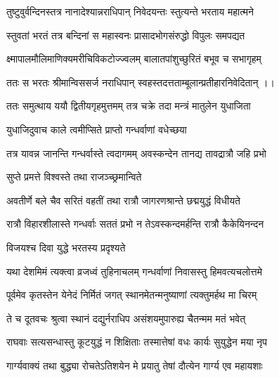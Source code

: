 \twolineshloka
{तुष्टुवुर्वन्दिनस्तत्र नानादेश्यान्नराधिपान्}
{निवेदयन्तः स्तुत्यन्ते भरताय महात्मने}%

\twolineshloka
{स्तुवतां भरतं तत्र बन्दिनां स महास्वनः}
{प्रासादभोगसंरुद्धो विपुलः समपद्यत}%

\twolineshloka
{क्ष्मापालमौलिमाणिक्यमरीचिविकटोज्ज्वलम्}
{बालातपांशुच्छुरितं बभूव च सभागृहम्}%

\twolineshloka
{ततः स भरतः श्रीमान्विससर्ज नराधिपान्}
{स्वहस्तदत्तताम्बूलान्प्रतीहारनिवेदितान् ।।}%

\twolineshloka
{ततः समुत्थाय ययौ द्वितीयगृहमुत्तमम्}
{तत्र चक्रे तदा मन्त्रं मातुलेन युधाजिता}%


{युधाजिदुवाच}
\onelineshloka
{काले त्वमीप्सिते प्राप्तो गन्धर्वाणां वधेच्छया}%

\twolineshloka
{तत्र यावन्न जानन्ति गन्धर्वास्ते त्वदागमम्}
{अवस्कन्देन तानद्य तावद्रात्रौ जहि प्रभो}%



\onelineshloka
{सुप्ते प्रमत्ते विश्वस्ते तथा राजञ्च्छ्रमान्विते}%

\twolineshloka
{अवतीर्णे बले चैव सरितं वहतीं तथा}
{रात्रौ जागरणश्रान्ते छद्मयुद्धं विधीयते}%

\twolineshloka
{रात्रौ विहारशीलास्ते गन्धर्वाः सततं प्रभो}
{न तेऽवस्कन्दमर्हन्ति रात्रौ कैकेयिनन्दन}%

\onelineshloka
{विजयश्च दिवा युद्धे भरतस्य प्रदृश्यते}



\twolineshloka
{यथा देशमिमं त्यक्त्वा व्रजध्वं तुहिनाचलम्}
{गन्धर्वाणां निवासस्तु हिमवत्यचलोत्तमे}%

\twolineshloka
{पूर्वमेव कृतस्तेन येनेदं निर्मितं जगत्}
{स्थानमेतन्मनुष्याणां त्यक्तुमर्हथ मा चिरम्}%

\twolineshloka
{ते च दूतवचः श्रुत्वा स्थानं दद्युर्नराधिप}
{असंशयमुपारुह्य चैतन्मम मतं भवेत्}%


\twolineshloka
{राघवाः सत्यसन्धास्तु कूटयुद्धं न शिक्षिताः}
{तस्मात्तेषां वधः कार्यः सुयुद्धेन मया नृप}%

\twolineshloka
{गार्ग्यवाक्यं तथा बुद्ध्या रोचतेऽतिशयेन मे}
{प्रयातु तेषां दौत्येन गार्ग्य एव महायशाः}%

